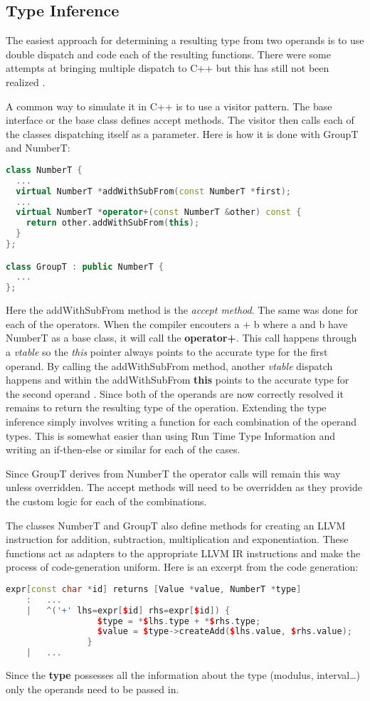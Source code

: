\subsection{Type Inference}

The easiest approach for determining a resulting type from two
operands is to use double dispatch and code each of the resulting
functions.  There were some attempts at bringing multiple dispatch to
C++ but this has still not been realized \cite{c++_multi_methods}.

A common way to simulate it in C++ is to use a visitor pattern. The
base interface or the base class defines accept methods. The visitor
then calls each of the classes dispatching itself as a parameter. Here
is how it is done with GroupT and NumberT:

\begin{lstlisting}[language=C++]
class NumberT {
  ...
  virtual NumberT *addWithSubFrom(const NumberT *first);
  ...
  virtual NumberT *operator+(const NumberT &other) const {
    return other.addWithSubFrom(this);
  }
};

class GroupT : public NumberT {
  ...
};
\end{lstlisting}

Here the addWithSubFrom method is the \emph{accept method}.  The same
was done for each of the operators. When the compiler encouters a + b
where a and b have NumberT as a base class, it will call the
\textbf{operator+}. This call happens through a \emph{vtable} so the
\emph{this} pointer always points to the accurate type for the first
operand. By calling the addWithSubFrom method, another \emph{vtable}
dispatch happens and within the addWithSubFrom \textbf{this} points to
the accurate type for the second operand \cite{Eckel}. Since both of
the operands are now correctly resolved it remains to return the
resulting type of the operation. Extending the type inference simply
involves writing a function for each combination of the operand
types. This is somewhat easier than using Run Time Type Information
and writing an if-then-else or similar for each of the cases.

Since GroupT derives from NumberT the operator calls will remain this
way unless overridden. The accept methods will need to be overridden
as they provide the custom logic for each of the combinations.

The classes NumberT and GroupT also define methods for creating an
LLVM instruction for addition, subtraction, multiplication and
exponentiation. These functions act as adapters to the appropriate
LLVM IR instructions and make the process of code-generation
uniform. Here is an excerpt from the code generation:
\begin{lstlisting}[language=C++, morekeywords=expr]
expr[const char *id] returns [Value *value, NumberT *type]
	:	...
	|	^('+' lhs=expr[$id] rhs=expr[$id]) {
                  $type = *$lhs.type + *$rhs.type;
                  $value = $type->createAdd($lhs.value, $rhs.value);
                }
	|	...
\end{lstlisting}
Since the \textbf{type} possesses all the information about the type
(modulus, interval\ldots) only the operands need to be passed in.

